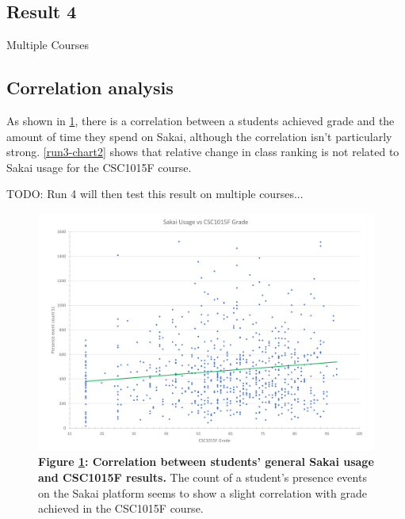 \subsection{Result 4}

Multiple Courses

\subsection{Correlation analysis}
As shown in \ref{run3-chart1}, there is a correlation between a students achieved grade and the amount of time they spend on Sakai, although the correlation isn't particularly strong. \ref{run3-chart2} shows that relative change in class ranking is not related to Sakai usage for the CSC1015F course.

TODO: Run 4 will then test this result on multiple courses...


\begin{figure}[H]
    \centering
    \begin{mdframed}
        \centering
        \includegraphics[scale=0.55]{./resources/figures/run3-chart1.png}
    \end{mdframed}
    \caption[CSC1015 grade vs general Sakai usage]{\textbf{Figure \ref{run3-chart1}: Correlation between students' general Sakai usage and CSC1015F results.} The count of a student's presence events on the Sakai platform seems to show a slight correlation with grade achieved in the CSC1015F course.}
    \label{run3-chart1}
\end{figure}

